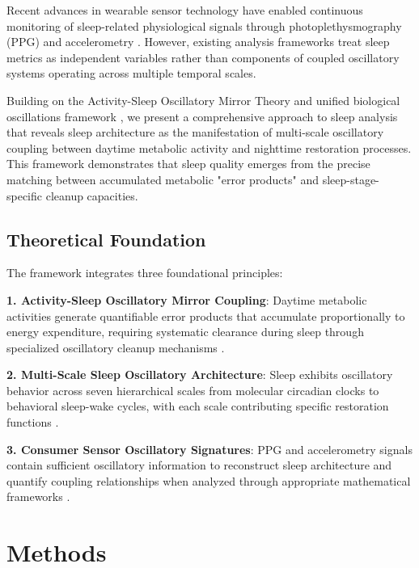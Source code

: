 \documentclass[twocolumn]{article}
\begin{document}
Recent advances in wearable sensor technology have enabled continuous monitoring of sleep-related physiological signals through photoplethysmography (PPG) and accelerometry \citep{menghini2021stochastic, de2019validation}. However, existing analysis frameworks treat sleep metrics as independent variables rather than components of coupled oscillatory systems operating across multiple temporal scales.

Building on the Activity-Sleep Oscillatory Mirror Theory \citep{huygens2024mirror} and unified biological oscillations framework \citep{huygens2024unified}, we present a comprehensive approach to sleep analysis that reveals sleep architecture as the manifestation of multi-scale oscillatory coupling between daytime metabolic activity and nighttime restoration processes. This framework demonstrates that sleep quality emerges from the precise matching between accumulated metabolic "error products" and sleep-stage-specific cleanup capacities.

\subsection{Theoretical Foundation}

The framework integrates three foundational principles:

\textbf{1. Activity-Sleep Oscillatory Mirror Coupling}: Daytime metabolic activities generate quantifiable error products that accumulate proportionally to energy expenditure, requiring systematic clearance during sleep through specialized oscillatory cleanup mechanisms \citep{xie2013sleep, nedergaard2013garbage}.

\textbf{2. Multi-Scale Sleep Oscillatory Architecture}: Sleep exhibits oscillatory behavior across seven hierarchical scales from molecular circadian clocks to behavioral sleep-wake cycles, with each scale contributing specific restoration functions \citep{borbely2016two, achermann2003mathematical}.

\textbf{3. Consumer Sensor Oscillatory Signatures}: PPG and accelerometry signals contain sufficient oscillatory information to reconstruct sleep architecture and quantify coupling relationships when analyzed through appropriate mathematical frameworks \citep{menghini2021stochastic}.

\section{Methods}
\end{document}
